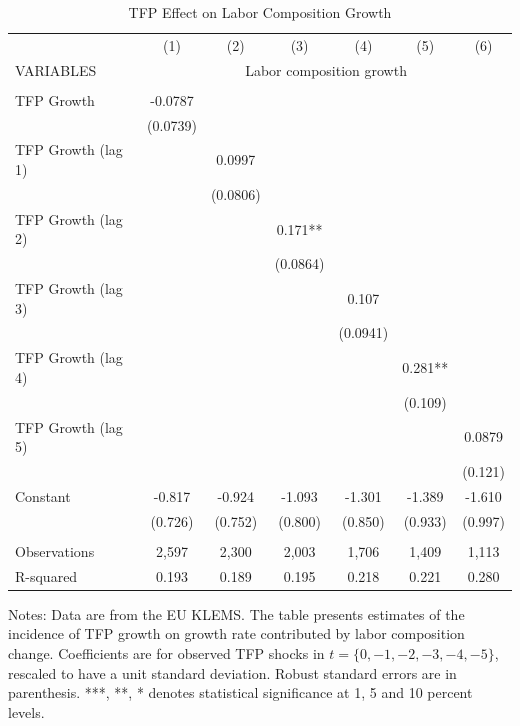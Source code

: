 \documentclass[12pt]{article}
\begin{document}
\begin{table}[h!]
\begin{center}
\scriptsize
\begin{tabular}{lcccccc} \hline \hline
 & (1) & (2) & (3) & (4) & (5) & (6)\\
VARIABLES & \multicolumn{6}{c}{Labor composition growth} \\ \hline
 &  &  &  &  &  &  \\
TFP Growth & -0.0787 &  &  &  &  &  \\
 & (0.0739) &  &  &  &  &  \\
TFP Growth (lag 1) &  & 0.0997 &  &  &  &  \\
 &  & (0.0806) &  &  &  &  \\
TFP Growth (lag 2) &  &  & 0.171** &  &  &  \\
 &  &  & (0.0864) &  &  &  \\
TFP Growth (lag 3) &  &  &  & 0.107 &  &  \\
 &  &  &  & (0.0941) &  &  \\
TFP Growth (lag 4) &  &  &  &  & 0.281** &  \\
 &  &  &  &  & (0.109) &  \\
TFP Growth (lag 5) &  &  &  &  &  & 0.0879 \\
 &  &  &  &  &  & (0.121) \\
Constant & -0.817 & -0.924 & -1.093 & -1.301 & -1.389 & -1.610 \\
 & (0.726) & (0.752) & (0.800) & (0.850) & (0.933) & (0.997) \\
 &  &  &  &  &  &  \\
Observations & 2,597 & 2,300 & 2,003 & 1,706 & 1,409 & 1,113 \\
 R-squared & 0.193 & 0.189 & 0.195 & 0.218 & 0.221 & 0.280 \\ \hline
\end{tabular}
\end{center}
\caption{TFP Effect on Labor Composition Growth}
\label{estimation2}
{\scriptsize Notes: Data are from the EU KLEMS. The table presents estimates of the incidence of TFP growth on growth rate contributed by labor composition change. Coefficients are for observed TFP shocks in $t = \{0,-1,-2,-3,-4,-5\}$, rescaled to have a unit standard deviation. Robust standard errors are in parenthesis. ***, **, * denotes statistical significance at 1, 5 and 10 percent levels.}
\end{table}
\end{document}
